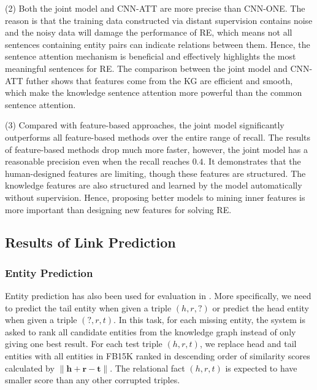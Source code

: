 \documentclass[11pt,a4paper]{article}
\begin{document}
(2) Both the joint model and CNN-ATT are more precise than CNN-ONE. The reason is that the training data constructed via distant supervision contains noise and the noisy data will damage the performance of RE, which means not all sentences containing entity pairs can indicate relations between them. Hence, the sentence attention mechanism is beneficial and effectively highlights the most meaningful sentences for RE. The comparison between the joint model and CNN-ATT futher shows that features come from the KG are efficient and smooth, which make the knowledge sentence attention more powerful than the common sentence attention.

(3) Compared with feature-based approaches, the joint model significantly outperforms all feature-based methods over the entire range of recall. The results of feature-based methods drop much more faster, however, the joint model has a reasonable precision even when the recall reaches $0.4$. It demonstrates that the human-designed features are limiting, though these features are structured. The knowledge features are also structured and learned by the model automatically without supervision. Hence, proposing better models to mining inner features is more important than designing new features for solving RE.



\subsection{Results of Link Prediction}

\subsubsection{Entity Prediction}

Entity prediction has also been used for evaluation in \cite{bordes2013translating,wang2014transh,lin2015learning,ji2015knowledge,he2015learning,xiao2015transg,ji2016knowledge}. More specifically, we need to predict the tail entity when given a triple $(h, r, ?)$ or predict the head entity when given a triple $(?, r ,t)$. In this task, for each missing entity, the system is asked to rank all candidate entities from the knowledge graph instead of only giving one best result. For each test triple $(h, r, t)$, we replace head and tail entities with all entities in FB15K ranked in descending order of similarity scores calculated by $\lVert \textbf{h} + \textbf{r} - \textbf{t} \rVert$. The relational fact $(h, r, t)$ is expected to have smaller score than any other corrupted triples.
\end{document}
